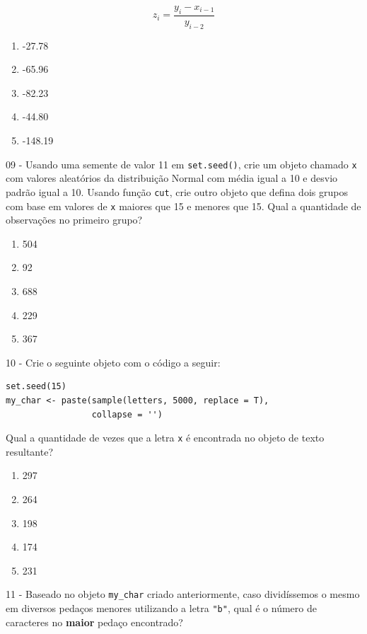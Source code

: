\documentclass[
  11pt,
]{book}
\providecommand{\tightlist}{%
  \setlength{\itemsep}{0pt}\setlength{\parskip}{0pt}}
\begin{document}
\[
z_i=\frac{y_i - x_{i-1}}{y_{i-2}}
\]

\begin{enumerate}
\def\labelenumi{\alph{enumi})}
\tightlist
\item
  -27.78
\item
  -65.96
\item
  -82.23
\item
  -44.80
\item
  -148.19
\end{enumerate}

09 -
Usando uma semente de valor 11 em \texttt{set.seed()}, crie um objeto chamado \texttt{x} com valores aleatórios da distribuição Normal com média igual a 10 e desvio padrão igual a 10. Usando função \texttt{cut}, crie outro objeto que defina dois grupos com base em valores de \texttt{x} maiores que 15 e menores que 15. Qual a quantidade de observações no primeiro grupo?

\begin{enumerate}
\def\labelenumi{\alph{enumi})}
\tightlist
\item
  504
\item
  92
\item
  688
\item
  229
\item
  367
\end{enumerate}

10 -
Crie o seguinte objeto com o código a seguir:

\begin{verbatim}
set.seed(15)
my_char <- paste(sample(letters, 5000, replace = T), 
                 collapse = '')
\end{verbatim}

Qual a quantidade de vezes que a letra \texttt{\textquotesingle{}x\textquotesingle{}} é encontrada no objeto de texto resultante?

\begin{enumerate}
\def\labelenumi{\alph{enumi})}
\tightlist
\item
  297
\item
  264
\item
  198
\item
  174
\item
  231
\end{enumerate}

11 -
Baseado no objeto \texttt{my\_char} criado anteriormente, caso dividíssemos o mesmo em diversos pedaços menores utilizando a letra \texttt{"b"}, qual é o número de caracteres no \textbf{maior} pedaço encontrado?
\end{document}

